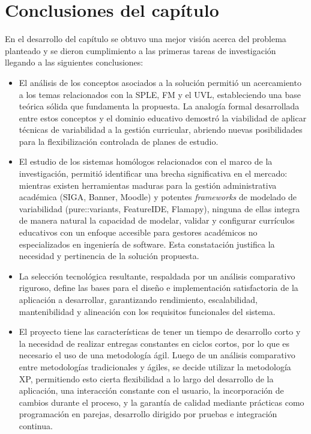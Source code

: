 \section{Conclusiones del capítulo}

En el desarrollo del capítulo se obtuvo una mejor visión acerca del problema planteado y se dieron cumplimiento a las primeras tareas de investigación llegando a las siguientes conclusiones:

\begin{itemize}
\item El análisis de los conceptos asociados a la solución permitió un acercamiento a los 
temas relacionados con la \ac{SPLE}, \ac{FM} y el \ac{UVL}, 
estableciendo una base teórica sólida que fundamenta la propuesta. La analogía formal 
desarrollada entre estos conceptos y el dominio educativo demostró la viabilidad de aplicar 
técnicas de variabilidad a la gestión curricular, abriendo nuevas posibilidades para la 
flexibilización controlada de planes de estudio.

\item El estudio de los sistemas homólogos relacionados con el marco de la investigación, 
permitió identificar una brecha significativa en el mercado: mientras existen herramientas 
maduras para la gestión administrativa académica (SIGA, Banner, Moodle) y potentes 
\textit{frameworks} de modelado de variabilidad (pure::variants, FeatureIDE, Flamapy), 
ninguna de ellas integra de manera natural la capacidad de modelar, validar y configurar 
currículos educativos con un enfoque accesible para gestores académicos no especializados 
en ingeniería de software. Esta constatación justifica la necesidad y pertinencia de la 
solución propuesta.

\item La selección tecnológica resultante, respaldada por un análisis comparativo riguroso, 
define las bases para el diseño e implementación satisfactoria de la aplicación a desarrollar, 
garantizando rendimiento, escalabilidad, mantenibilidad y alineación con los requisitos funcionales del 
sistema.

\item El proyecto tiene las características de tener un tiempo de desarrollo corto y la 
necesidad de realizar entregas constantes en ciclos cortos, por lo que es necesario el uso 
de una metodología ágil. Luego de un análisis comparativo entre metodologías tradicionales 
y ágiles, se decide utilizar la metodología \ac{XP}, permitiendo esto 
cierta flexibilidad a lo largo del desarrollo de la aplicación, una interacción constante 
con el usuario, la incorporación de cambios durante el proceso, y la garantía de calidad 
mediante prácticas como programación en parejas, desarrollo dirigido por pruebas e 
integración continua.
\end{itemize}